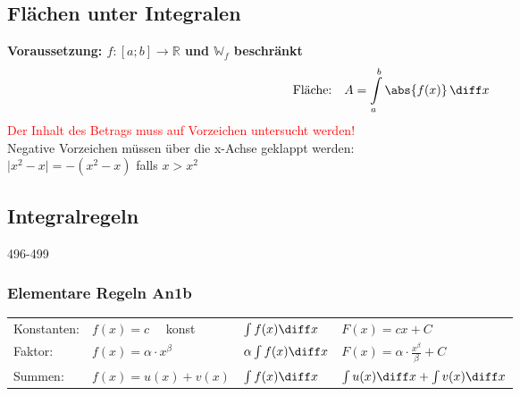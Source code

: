 \subsection{Flächen unter Integralen}

\textbf{Voraussetzung: $f: [a;b] \to \mathbb{R}$ und $\mathbb{W}_f$ beschränkt}
$$ \text{Fläche:} \quad A = \int \limits_{a}^{b} \abs{ f(x) } \, \diff x $$
\textcolor{red}{Der Inhalt des Betrags muss auf Vorzeichen untersucht werden!} \\
Negative Vorzeichen müssen über die x-Achse geklappt werden: \\
$\vert x^2 - x \vert = -(x^2 - x)$ falls $x > x^2$ 


\subsection{Integralregeln}{496-499}

\subsubsection{Elementare Regeln An1b}

\vspace{-0.2cm}
\renewcommand{\arraystretch}{1.6}
\begin{tabular}{llll}
    Konstanten:     & $f(x) = c \quad$ konst                & $\int f(x) \diff x$                      & $F(x) = cx + C$\\
    Faktor:         & $f(x) = \alpha \cdot x^\beta$             & $\alpha \int f(x) \diff x$           & $F(x) = \alpha \cdot \frac{x^\beta}{\beta} + C$ \\
    Summen:         & $f(x) = u(x) + v(x) $                 & $\int f(x) \diff x$                      & $\int u(x) \diff x + \int v(x) \diff x$    
\end{tabular}


